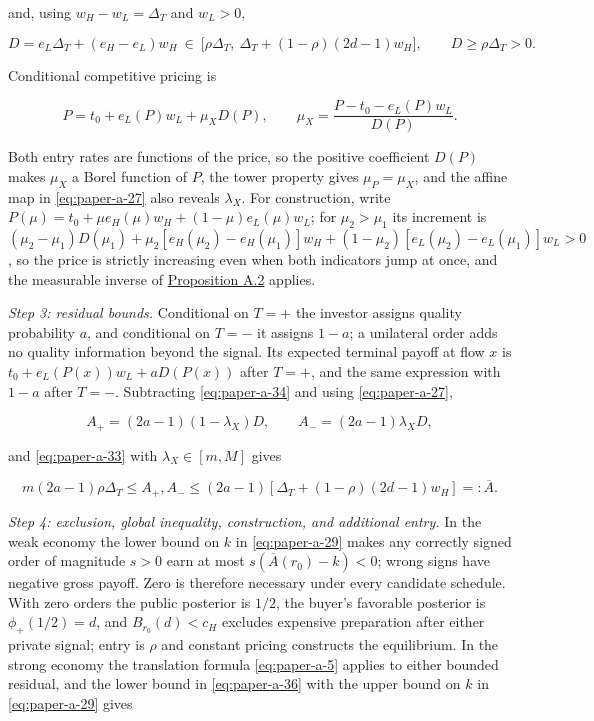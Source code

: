 \documentclass[
  12pt,
]{article}
\begin{document}
and, using \(w_H-w_L=\Delta_T\) and \(w_L>0\),

\[
D=e_L\Delta_T+(e_H-e_L)w_H\ \in\ \big[\rho\Delta_T,\ \Delta_T+(1-\rho)(2d-1)w_H\big],
\qquad D\ge\rho\Delta_T>0.
\tag{A.33}\label{eq:paper-a-33}
\]

Conditional competitive pricing is

\[
P=t_0+e_L(P)w_L+\mu_XD(P),
\qquad
\mu_X=\frac{P-t_0-e_L(P)w_L}{D(P)}.
\tag{A.34}\label{eq:paper-a-34}
\]

Both entry rates are functions of the price, so the positive coefficient
\(D(P)\) makes \(\mu_X\) a Borel function of \(P\), the tower property
gives \(\mu_P=\mu_X\), and the affine map in \eqref{eq:paper-a-27} also
reveals \(\lambda_X\). For construction, write
\(P(\mu)=t_0+\mu e_H(\mu)w_H+(1-\mu)e_L(\mu)w_L\); for \(\mu_2>\mu_1\)
its increment is
\((\mu_2-\mu_1)D(\mu_1)+\mu_2[e_H(\mu_2)-e_H(\mu_1)]w_H+(1-\mu_2)[e_L(\mu_2)-e_L(\mu_1)]w_L>0\),
so the price is strictly increasing even when both indicators jump at
once, and the measurable inverse of
\hyperref[result-proposition-a-2]{Proposition A.2} applies.

\emph{Step 3: residual bounds.} Conditional on \(T=+\) the investor
assigns quality probability \(a\), and conditional on \(T=-\) it assigns
\(1-a\); a unilateral order adds no quality information beyond the
signal. Its expected terminal payoff at flow \(x\) is
\(t_0+e_L(P(x))w_L+aD(P(x))\) after \(T=+\), and the same expression
with \(1-a\) after \(T=-\). Subtracting \eqref{eq:paper-a-34} and using
\eqref{eq:paper-a-27},

\[
A_+=(2a-1)(1-\lambda_X)D,\qquad A_-=(2a-1)\lambda_XD,
\tag{A.35}\label{eq:paper-a-35}
\]

and \eqref{eq:paper-a-33} with \(\lambda_X\in[m,M]\) gives

\[
m(2a-1)\rho\Delta_T\le A_+,A_-
\le(2a-1)[\Delta_T+(1-\rho)(2d-1)w_H]=:\overline A.
\tag{A.36}\label{eq:paper-a-36}
\]

\emph{Step 4: exclusion, global inequality, construction, and additional
entry.} In the weak economy the lower bound on \(k\) in
\eqref{eq:paper-a-29} makes any correctly signed order of magnitude
\(s>0\) earn at most \(s(\overline A(r_0)-k)<0\); wrong signs have
negative gross payoff. Zero is therefore necessary under every candidate
schedule. With zero orders the public posterior is \(1/2\), the buyer's
favorable posterior is \(\phi_+(1/2)=d\), and \(B_{r_0}(d)<c_H\)
excludes expensive preparation after either private signal; entry is
\(\rho\) and constant pricing constructs the equilibrium. In the strong
economy the translation formula \eqref{eq:paper-a-5} applies to either
bounded residual, and the lower bound in \eqref{eq:paper-a-36} with the
upper bound on \(k\) in \eqref{eq:paper-a-29} gives
\end{document}
